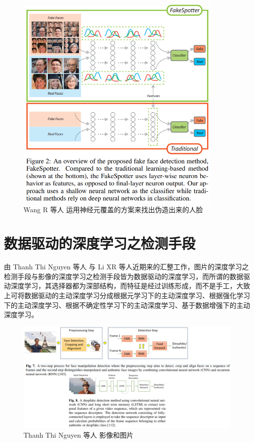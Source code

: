 \begin{figure}[htb]
\centering 
\includegraphics[width=0.90\textwidth]{img/ch3m10.png} 
\caption{ Wang R 等人 \cite{wang1909fakespotter} 运用神经元覆盖的方案来找出伪造出来的人脸}
\label{Test}
\end{figure}


\section{数据驱动的深度学习之检测手段}

由 Thanh Thi Nguyen 等人 \cite{https://doi.org/10.48550/arxiv.1909.11573} 与 Li XR 等人近期来的汇整工作\cite{2021496}，图片的深度学习之检测手段与影像的深度学习之检测手段皆为数据驱动的深度学习，而所谓的数据驱动深度学习，其选择器都为深部结构，而特征是经过训练形成，而不是手工，大致上可将数据驱动的主动深度学习分成根据元学习下的主动深度学习、根据强化学习下的主动深度学习、根据不确定性学习下的主动深度学习、基于数据增强下的主动深度学习。

\begin{figure}[htb]
\centering 
\includegraphics[width=1.05\textwidth]{img/ch3m12.png} 
\caption{ Thanh Thi Nguyen 等人 \cite{https://doi.org/10.48550/arxiv.1909.11573} 影像和图片}
\label{Test}
\end{figure}


